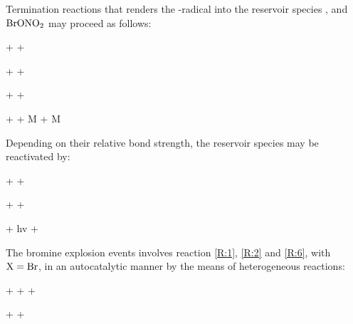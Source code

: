 \medskip

Termination reactions that renders the -radical into the reservoir species ,  and $\mathrm{BrONO_2}$ may proceed as follows: 

\begin{reaction}
     +  \rightarrow {} + 
    \label{R:6} 
\end{reaction}

\begin{reaction}
     +  \rightarrow {} + 
    \label{R:17}
\end{reaction}


\begin{reaction}
     +  \rightarrow {} + 
    \label{R:16}
\end{reaction}

\begin{reaction}
     +  + M \rightarrow {} + M
    \label{R:9}
\end{reaction}

Depending on their relative bond strength, the reservoir species may be reactivated by: 


\begin{reaction}
     +  \rightarrow {} + 
    \label{R:14}
\end{reaction}



\begin{reaction}
     +    + 
    \label{R:13}
\end{reaction}

\begin{reaction}
     + hv \rightarrow {} + 
    \label{R:18}
\end{reaction}


The bromine explosion events involves reaction \ref{R:1}, \ref{R:2} and \ref{R:6}, with $\mathrm{X} = \mathrm{Br}$, in an autocatalytic manner by the means of heterogeneous reactions: 

\begin{reaction}
     +  +    +  \label{R:7} 
\end{reaction}
\begin{reaction}
     +    +  \label{R:8}
\end{reaction}



